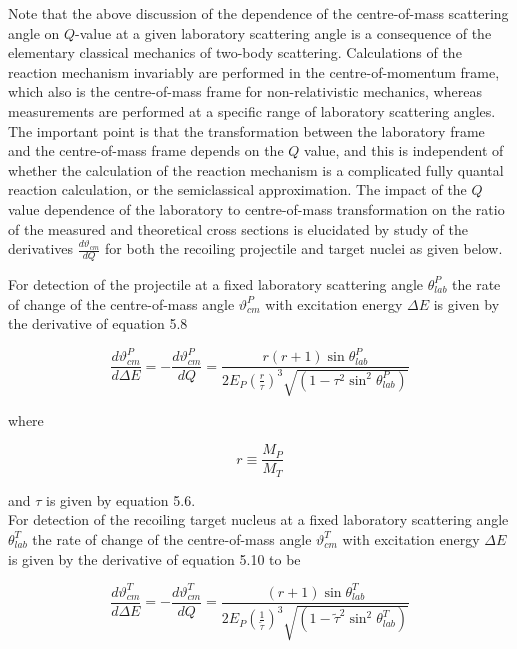 \documentclass[10pt]{article}
\begin{document}
Note that the above discussion of the dependence of the centre-of-mass scattering angle on $Q$-value at a given laboratory scattering angle is a consequence of the elementary classical mechanics of two-body scattering. Calculations of the reaction mechanism invariably are performed in the centre-of-momentum frame, which also is the centre-of-mass frame for non-relativistic mechanics, whereas measurements are performed at a specific range of laboratory scattering angles. The important point is that the transformation between the laboratory frame and the centre-of-mass frame depends on the $Q$ value, and this is independent of whether the calculation of the reaction mechanism is a complicated fully quantal reaction calculation, or the semiclassical approximation. The impact of the $Q$ value dependence of the laboratory to centre-of-mass transformation on the ratio of the measured and theoretical cross sections is elucidated by study of the derivatives $\frac{d \vartheta_{c m}}{d Q}$ for both the recoiling projectile and target nuclei as given below.

For detection of the projectile at a fixed laboratory scattering angle $\theta_{l a b}^{P}$ the rate of change of the centre-of-mass angle $\vartheta_{c m}^{P}$ with excitation energy $\Delta E$ is given by the derivative of equation 5.8


\begin{equation*}
\frac{d \vartheta_{c m}^{P}}{d \Delta E}=-\frac{d \vartheta_{c m}^{P}}{d Q}=\frac{r(r+1) \sin \theta_{l a b}^{P}}{2 E_{P}\left(\frac{r}{\tau}\right)^{3} \sqrt{\left(1-\tau^{2} \sin ^{2} \theta_{l a b}^{P}\right)}} \tag{5.20}
\end{equation*}


where


\begin{equation*}
r \equiv \frac{M_{P}}{M_{T}} \tag{5.21}
\end{equation*}


and $\tau$ is given by equation 5.6.\\
For detection of the recoiling target nucleus at a fixed laboratory scattering angle $\theta_{l a b}^{T}$ the rate of change of the centre-of-mass angle $\vartheta_{c m}^{T}$ with excitation energy $\Delta E$ is given by the derivative of equation 5.10 to be


\begin{equation*}
\frac{d \vartheta_{c m}^{T}}{d \Delta E}=-\frac{d \vartheta_{c m}^{T}}{d Q}=\frac{(r+1) \sin \theta_{l a b}^{T}}{2 E_{P}\left(\frac{1}{\tilde{\tau}}\right)^{3} \sqrt{\left(1-\tilde{\tau}^{2} \sin ^{2} \theta_{l a b}^{T}\right)}} \tag{5.22}
\end{equation*}
\end{document}
